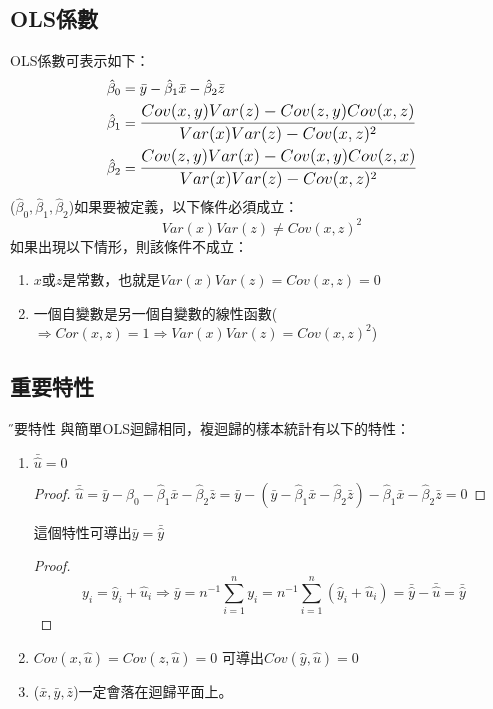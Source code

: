 \documentclass[xcolor=dvipsnames]{beamer}
\begin{document}
\subsection{OLS係數}
\begin{frame}
OLS係數可表示如下：
\begin{align*}
\hat{\beta}_{0} & =\bar{y}-\hat{\beta}_{1}\bar{x}-\hat{\beta}_{2}\bar{z}\\
\hat{\beta}_{1} & = \mathlarger{\frac{Cov(x,y)Var(z)-Cov(z,y)Cov(x,z)}{Var(x)Var(z)-Cov(x,z)^2}}\\
\hat{\beta}_{2} & = \mathlarger{\frac{Cov(z,y)Var(x)-Cov(x,y)Cov(z,x)}{Var(x)Var(z)-Cov(x,z)^2}}
\end{align*}
($ \hat{\beta}_{0}, \hat{\beta}_{1},\hat{\beta}_{2} $)如果要被定義，以下條件必須成立：
\[Var(x)Var(z)\ne Cov(x,z)^2 \]
如果出現以下情形，則該條件不成立：
\begin{enumerate}
\item $x$或$z$是常數，也就是$Var(x)Var(z)=Cov(x,z)=0$
\item 一個自變數是另一個自變數的線性函數($\Rightarrow Cor(x,z)=1\Rightarrow Var(x)Var(z) = Cov(x,z)^2$)
\end{enumerate}
\end{frame}
\subsection{重要特性}
\begin{frame}{\H 重要特性}
與簡單OLS迴歸相同，複迴歸的樣本統計有以下的特性：
\begin{enumerate}
\item $\bar{\hat{u}}=0$
\begin{proof}
$\bar{\hat{u}}=\bar{y}-\hat{\beta}_{0}-\hat{\beta}_{1}\bar{x}-\hat{\beta}_{2}\bar{z}
= \bar{y}-(\bar{y}-\hat{\beta}_{1}\bar{x}-\hat{\beta}_{2}\bar{z})-
\hat{\beta}_{1}\bar{x}-\hat{\beta}_{2}\bar{z}=0$
\end{proof}
這個特性可導出$\bar{y} = \bar{\hat{y}}$

\begin{proof}
\[y_{i}=\hat{y}_{i}+\hat{u}_{i}\Rightarrow \bar{y}=n^{-1}\sum_{i=1}^{n}y_{i}=n^{-1}\sum_{i=1}^{n}(\hat{y}_{i}+\hat{u}_{i})=\bar{\hat{y}}-\bar{\hat{u}}=\bar{\hat{y}}\]
\end{proof}
\item $Cov(x,\hat{u})=Cov(z,\hat{u})=0$
可導出$Cov(\hat{y},\hat{u})=0$
\item ($\bar{x},\bar{y},\bar{z}$)一定會落在迴歸平面上。
\end{enumerate}
\end{frame}
\end{document}
